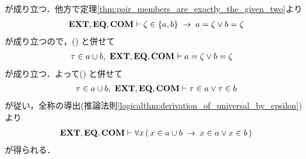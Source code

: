 \begin{sketch}
\begin{description}
				が成り立つ．他方で定理\ref{thm:pair_members_are_exactly_the_given_two}より
				\begin{align}
					\mbox{{\bf EXT}},\mbox{{\bf EQ}},\mbox{\bf COM} \vdash
					\zeta \in \{a,b\} \hspace{0.25em}\rightarrow\hspace{0.25em} a = \zeta \vee b = \zeta
				\end{align}
				が成り立つので，()
				と併せて
				\begin{align}
					\tau \in a \cup b,\ \mbox{{\bf EXT}},\mbox{{\bf EQ}},\mbox{\bf COM} &\vdash 
					a = \zeta \vee b = \zeta
				\end{align}
				が成り立つ．よって()
				と併せて
				\begin{align}
					\tau \in a \cup b,\ \mbox{{\bf EXT}},\mbox{{\bf EQ}},\mbox{\bf COM} \vdash 
					\tau \in a \vee \tau \in b
				\end{align}
				が従い，全称の導出(推論法則\ref{logicalthm:derivation_of_universal_by_epsilon})より
				\begin{align}
					\mbox{{\bf EXT}},\mbox{{\bf EQ}},\mbox{\bf COM} \vdash 
					\forall x\, (\, x \in a \cup b \hspace{0.25em}\rightarrow\hspace{0.25em} x \in a \vee x \in b\, )
				\end{align}
				が得られる．
				

\end{description}
\end{sketch}
